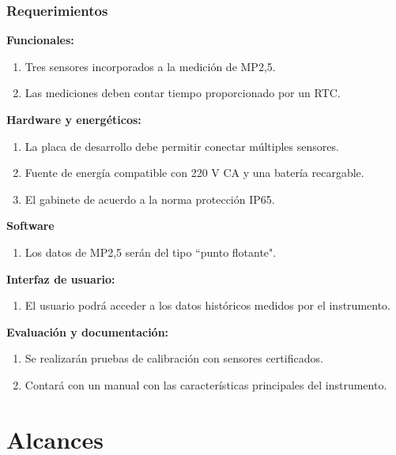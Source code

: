 \documentclass[aspectratio=169]{beamer}
\begin{document}
\begin{frame}
	\frametitle{Requerimientos}
		\textbf{Funcionales:}
		\begin{enumerate}
			\item Tres sensores incorporados a la medición de MP2,5.
			\item Las mediciones deben contar tiempo proporcionado por un RTC.
		
		\end{enumerate}
		\textbf{Hardware y energéticos:}
		\begin{enumerate}
			\item La placa de desarrollo debe permitir conectar múltiples sensores.
				\item Fuente de energía compatible con 220 V CA y una batería recargable.
			\item El gabinete de acuerdo a la norma protección IP65. 
				
		\end{enumerate}
		\textbf{Software}
		\begin{enumerate}
			\item Los datos de MP2,5 serán del tipo ``punto flotante".
		\end{enumerate}
		
		\textbf{Interfaz de usuario:}
		\begin{enumerate}
			\item El usuario podrá acceder a los datos históricos medidos por el instrumento.
		\end{enumerate}
		
		\textbf{Evaluación y documentación:}
		\begin{enumerate}
			\item Se realizarán pruebas de calibración con sensores certificados.
			\item Contará con un manual con las características principales del instrumento.
		\end{enumerate}
		
\end{frame}

\section{Alcances}
\end{document}
